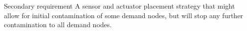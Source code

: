 \documentclass[authoryear,preprint,review,12pt]{elsarticle}
\begin{document}
Secondary requirement %
A sensor and actuator placement strategy that might allow for initial
contamination of some demand nodes, but will stop any further contamination
to all demand nodes.




%
%
%
%


%
%
%
\end{document}

